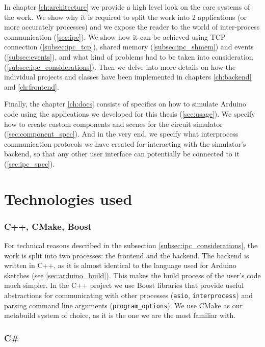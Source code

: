 In chapter \ref{ch:architecture} we provide a high level look on the core systems of the work. We show why it is required to split the work into 2 applications (or more accurately processes) and we expose the reader to the world of inter-process communication (\ref{sec:ipc}). We show how it can be achieved using TCP connection (\ref{subsec:ipc_tcp}), shared memory (\ref{subsec:ipc_shmem}) and events (\ref{subsec:events}), and what kind of problems had to be taken into consideration (\ref{subsec:ipc_considerations}). Then we delve into more details on how the individual projects and classes have been implemented in chapters \ref{ch:backend} and \ref{ch:frontend}.

Finally, the chapter \ref{ch:docs} consists of specifics on how to simulate Arduino code using the applications we developed for this thesis (\ref{sec:usage}). We specify how to create custom components and scenes for the circuit simulator (\ref{sec:component_spec}). And in the very end, we specify what interprocess communication protocols we have created for interacting with the simulator's backend, so that any other user interface can potentially be connected to it (\ref{sec:ipc_spec}).

\section{Technologies used}

\subsubsection{C++, CMake, Boost}

For technical reasons described in the subsection \ref{subsec:ipc_considerations}, the work is split into two processes: the frontend and the backend. The backend is written in C++, as it is almost identical to the language used for Arduino sketches (see \ref{sec:arduino_build}). This makes the build process of the user's code much simpler. In the C++ project we use Boost libraries that provide useful abstractions for communicating with other processes (\texttt{asio}, \texttt{interprocess}) and parsing command line arguments (\texttt{program\_options}). We use CMake as our metabuild system of choice, as it is the one we are the most familiar with.

\subsubsection{C\#}
 
